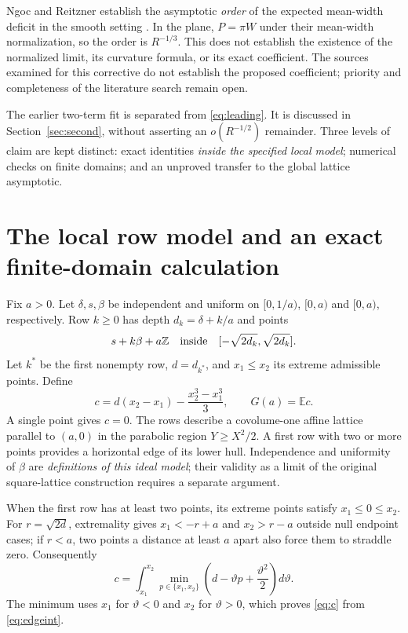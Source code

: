 \documentclass[11pt,a4paper]{article}
\newcommand{\E}{\mathbb E}
\newcommand{\Z}{\mathbb Z}
\begin{document}
Ngoc and Reitzner establish the asymptotic \emph{order} of the expected mean-width deficit in the smooth setting \cite{NR}. In the plane, $P=\pi W$ under their mean-width normalization, so the order is $R^{-1/3}$. This does not establish the existence of the normalized limit, its curvature formula, or its exact coefficient. The sources examined for this corrective do not establish the proposed coefficient; priority and completeness of the literature search remain open.

The earlier two-term fit is separated from \eqref{eq:leading}. It is discussed in Section~\ref{sec:second}, without asserting an $o(R^{-1/2})$ remainder. Three levels of claim are kept distinct: exact identities \emph{inside the specified local model}; numerical checks on finite domains; and an unproved transfer to the global lattice asymptotic.

\section{The local row model and an exact finite-domain calculation}
Fix $a>0$. Let $\delta,s,\beta$ be independent and uniform on $[0,1/a)$, $[0,a)$ and $[0,a)$, respectively. Row $k\geq0$ has depth $d_k=\delta+k/a$ and points
\[
 s+k\beta+a\Z\quad\hbox{inside}\quad[-\sqrt{2d_k},\sqrt{2d_k}].
\]
Let $k^*$ be the first nonempty row, $d=d_{k^*}$, and $x_1\leq x_2$ its extreme admissible points. Define
\begin{equation}\label{eq:c}
 c=d(x_2-x_1)-\frac{x_2^3-x_1^3}{3},\qquad G(a)=\E c.
\end{equation}
A single point gives $c=0$. The rows describe a covolume-one affine lattice parallel to $(a,0)$ in the parabolic region $Y\geq X^2/2$. A first row with two or more points provides a horizontal edge of its lower hull. Independence and uniformity of $\beta$ are \emph{definitions of this ideal model}; their validity as a limit of the original square-lattice construction requires a separate argument.

When the first row has at least two points, its extreme points satisfy $x_1\leq0\leq x_2$. For $r=\sqrt{2d}$, extremality gives $x_1<-r+a$ and $x_2>r-a$ outside null endpoint cases; if $r<a$, two points a distance at least $a$ apart also force them to straddle zero. Consequently
\begin{equation}\label{eq:edgeint}
 c=\int_{x_1}^{x_2}\min_{p\in\{x_1,x_2\}}
       \left(d-\vartheta p+\frac{\vartheta^2}{2}\right)d\vartheta.
\end{equation}
The minimum uses $x_1$ for $\vartheta<0$ and $x_2$ for $\vartheta>0$, which proves \eqref{eq:c} from \eqref{eq:edgeint}.
\end{document}
